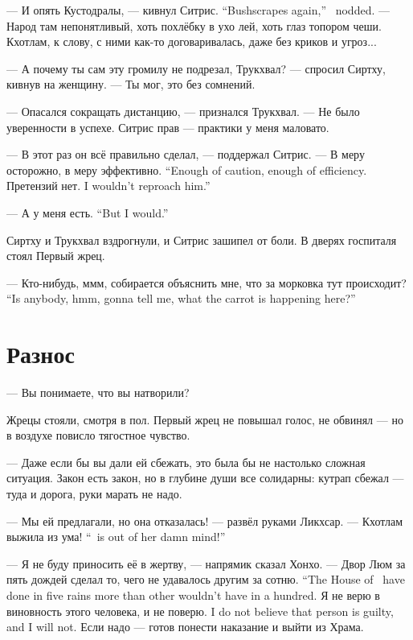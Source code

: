 {--- И опять Кустодралы, --- кивнул Ситрис.}
{``Bushscrapes again,'' \Sitris\ nodded.}
--- Народ там непонятливый, хоть похлёбку в ухо лей, хоть глаз топором чеши.
Кхотлам, к слову, с ними как-то договаривалась, даже без криков и угроз...

--- А почему ты сам эту громилу не подрезал, Трукхвал? --- спросил Сиртху, кивнув на женщину.
--- Ты мог, это без сомнений.

--- Опасался сокращать дистанцию, --- признался Трукхвал.
--- Не было уверенности в успехе.
Ситрис прав --- практики у меня маловато.

--- В этот раз он всё правильно сделал, --- поддержал Ситрис.
{--- В меру осторожно, в меру эффективно.}
{``Enough of caution, enough of efficiency.}
{Претензий нет.}
{I wouldn't reproach him.''}

{--- А у меня есть.}
{``But I would.''}

Сиртху и Трукхвал вздрогнули, и Ситрис зашипел от боли.
В дверях госпиталя стоял Первый жрец.

{--- Кто-нибудь, ммм, собирается объяснить мне, что за морковка тут происходит?}
{``Is anybody, hmm, gonna tell me, what the carrot is happening here?''}

\section{Разнос}

--- Вы понимаете, что вы натворили?

Жрецы стояли, смотря в пол.
Первый жрец не повышал голос, не обвинял --- но в воздухе повисло тягостное чувство.

--- Даже если бы вы дали ей сбежать, это была бы не настолько сложная ситуация.
Закон есть закон, но в глубине души все солидарны: кутрап сбежал --- туда и дорога, руки марать не надо.

--- Мы ей предлагали, но она отказалась! --- развёл руками Ликхсар.
{--- Кхотлам выжила из ума!}
{``\Kchotlam\ is out of her damn mind!''}

--- Я не буду приносить её в жертву, --- напрямик сказал Хонхо.
{--- Двор Люм за пять дождей сделал то, чего не удавалось другим за сотню.}
{``The House of \Loem\ have done in five rains more than other wouldn't have in a hundred.}
{Я не верю в виновность этого человека, и не поверю.}
{I do not believe that person is guilty, and I will not.}
Если надо --- готов понести наказание и выйти из Храма.

